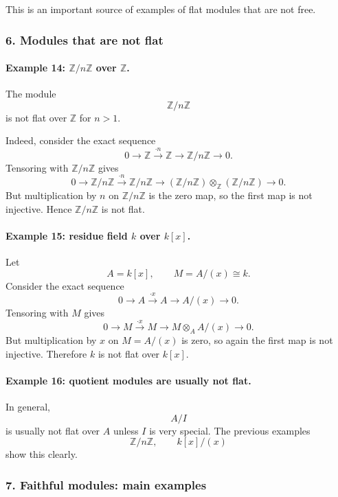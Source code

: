 \documentclass[12pt,a4paper]{article}
\theoremstyle{notespace}
\theoremstyle{definition}
\begin{document}
This is an important source of examples of flat modules that are not free.

\subsubsection{6. Modules that are not flat}

\paragraph{Example 14: \(\mathbb Z/n\mathbb Z\) over \(\mathbb Z\).}

The module
\[
\mathbb Z/n\mathbb Z
\]
is not flat over \(\mathbb Z\) for \(n>1\).

Indeed, consider the exact sequence
\[
0
\longrightarrow
\mathbb Z
\overset{\cdot n}{\longrightarrow}
\mathbb Z
\longrightarrow
\mathbb Z/n\mathbb Z
\longrightarrow
0.
\]
Tensoring with \(\mathbb Z/n\mathbb Z\) gives
\[
0
\longrightarrow
\mathbb Z/n\mathbb Z
\overset{\cdot n}{\longrightarrow}
\mathbb Z/n\mathbb Z
\longrightarrow
(\mathbb Z/n\mathbb Z)\otimes_{\mathbb Z}(\mathbb Z/n\mathbb Z)
\longrightarrow
0.
\]
But multiplication by \(n\) on \(\mathbb Z/n\mathbb Z\) is the zero map, so the first map is not injective. Hence \(\mathbb Z/n\mathbb Z\) is not flat.

\paragraph{Example 15: residue field \(k\) over \(k[x]\).}

Let
\[
A=k[x],
\qquad
M=A/(x)\cong k.
\]
Consider the exact sequence
\[
0
\longrightarrow
A
\overset{\cdot x}{\longrightarrow}
A
\longrightarrow
A/(x)
\longrightarrow
0.
\]
Tensoring with \(M\) gives
\[
0
\longrightarrow
M
\overset{\cdot x}{\longrightarrow}
M
\longrightarrow
M\otimes_A A/(x)
\longrightarrow
0.
\]
But multiplication by \(x\) on \(M=A/(x)\) is zero, so again the first map is not injective. Therefore \(k\) is not flat over \(k[x]\).

\paragraph{Example 16: quotient modules are usually not flat.}

In general,
\[
A/I
\]
is usually not flat over \(A\) unless \(I\) is very special. The previous examples
\[
\mathbb Z/n\mathbb Z,\qquad k[x]/(x)
\]
show this clearly.

\subsubsection{7. Faithful modules: main examples}
\end{document}
